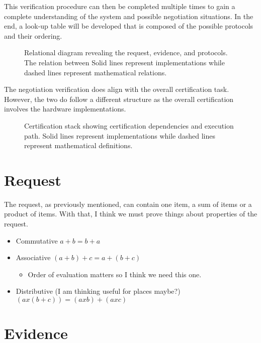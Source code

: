 \documentclass[10pt]{report}
\begin{document}
This verification procedure can then be completed multiple times to gain
a complete understanding of the system and possible negotiation situations.
In the end, a look-up table will be developed that is composed of the possible
protocols and their ordering. 

\begin{figure}[hbtp]
  \centering
  
  \caption[Relational Figure]{ Relational diagram revealing the request,
    evidence, and protocols. The relation between  Solid lines
    represent implementations while dashed lines represent
    mathematical relations.}
  \label{fig:certification-fig}
\end{figure}

The negotiation verification does align with the overall certification task.
However, the two do follow a different structure as the overall certification
involves the hardware implementations. 

\begin{figure}[hbtp]
  \centering
  
  \caption[Certification Figure]{Certification stack showing
    certification dependencies and execution path. Solid lines
    represent implementations while dashed lines represent
    mathematical definitions.}
  \label{fig:certification-fig}
\end{figure}

\section{Request}

The request, as previously mentioned, can contain one item, a sum of
items or a product of items. With that, I think we must prove things
about properties of the request.

\begin{itemize}
\item Commutative $ a + b = b + a $
\item Associative $ (a + b) + c = a + (b + c) $
  \begin{itemize}
  \item Order of evaluation matters so I think we need this one.
  \end{itemize}
\item Distributive (I am thinking useful for places maybe?)
  $ (a x (b + c)) = (a x b) + (a x c) $
\end{itemize}

\section{Evidence}
\end{document}
